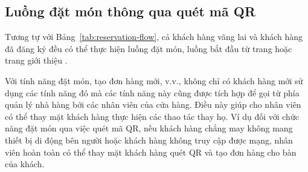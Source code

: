 \subsection*{Luồng đặt món thông qua quét mã QR}\label{sec:order-flow}
Tương tự với Bảng~\ref{tab:reservation-flow}, cả khách hàng vãng lai và khách hàng đã đăng ký đều có thể thực hiện luồng đặt món, luồng bắt đầu từ trang  hoặc trang giới thiệu .

\begin{table}[]
\caption{Bảng mô tả luồng nghiệp vụ của chức năng đặt món qua QR}
\label{tab:order-flow}
\end{table}
Với tính năng đặt món, tạo đơn hàng mới, v.v., không chỉ có khách hàng mới sử dụng các tính năng đó mà các tính năng này cũng được tích hợp để gọi từ phía quản lý nhà hàng bởi các nhân viên của cửa hàng.
Điều này giúp cho nhân viên có thể thay mặt khách hàng thực hiện các thao tác thay họ.
Ví dụ đối với chức năng đặt món qua việc quét mã QR, nếu khách hàng chẳng may không mang thiết bị di động bên người hoặc khách hàng không truy cập được mạng, nhân viên hoàn toàn có thể thay mặt khách hàng quét QR và tạo đơn hàng cho bàn của khách.

